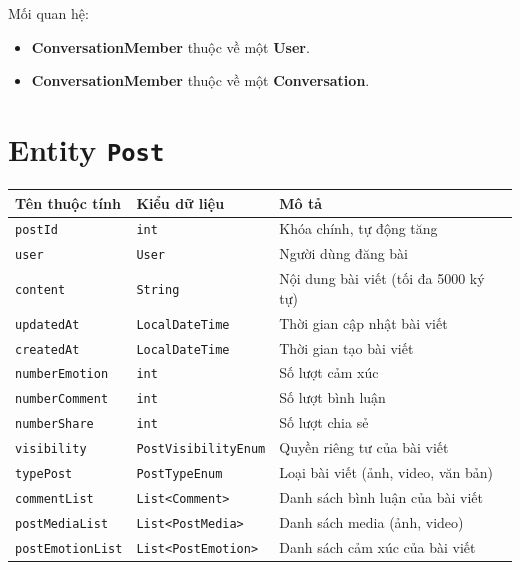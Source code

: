 \vspace{0.5cm}
Mối quan hệ:
\begin{itemize}
    \item \textbf{ConversationMember} thuộc về một \textbf{User}.
    \item \textbf{ConversationMember} thuộc về một \textbf{Conversation}.
\end{itemize}

\section{Entity \texttt{Post}}

\begin{longtable}{|>{\raggedright\arraybackslash}p{4cm}|>{\raggedright\arraybackslash}p{4cm}|>{\raggedright\arraybackslash}p{6cm}|}
\hline
\textbf{Tên thuộc tính} & \textbf{Kiểu dữ liệu} & \textbf{Mô tả} \\
\hline
\texttt{postId} & \texttt{int} & Khóa chính, tự động tăng \\
\hline
\texttt{user} & \texttt{User} & Người dùng đăng bài \\
\hline
\texttt{content} & \texttt{String} & Nội dung bài viết (tối đa 5000 ký tự) \\
\hline
\texttt{updatedAt} & \texttt{LocalDateTime} & Thời gian cập nhật bài viết \\
\hline
\texttt{createdAt} & \texttt{LocalDateTime} & Thời gian tạo bài viết \\
\hline
\texttt{numberEmotion} & \texttt{int} & Số lượt cảm xúc \\
\hline
\texttt{numberComment} & \texttt{int} & Số lượt bình luận \\
\hline
\texttt{numberShare} & \texttt{int} & Số lượt chia sẻ \\
\hline
\texttt{visibility} & \texttt{PostVisibilityEnum} & Quyền riêng tư của bài viết \\
\hline
\texttt{typePost} & \texttt{PostTypeEnum} & Loại bài viết (ảnh, video, văn bản) \\
\hline
\texttt{commentList} & \texttt{List<Comment>} & Danh sách bình luận của bài viết \\
\hline
\texttt{postMediaList} & \texttt{List<PostMedia>} & Danh sách media (ảnh, video) \\
\hline
\texttt{postEmotionList} & \texttt{List<PostEmotion>} & Danh sách cảm xúc của bài viết \\
\hline
\end{longtable}

